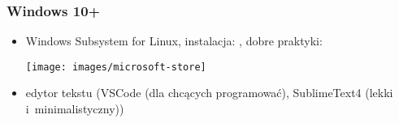 \begin{frame}
\frametitle{Windows 10+}

\begin{itemize}\scriptsize

 \item Windows Subsystem for Linux,\newline
 instalacja: ,\newline
 dobre
 praktyki: 

 \texttt{[image: images/microsoft-store]}

 \item edytor tekstu (VSCode (dla chcących programować), SublimeText4
 (lekki i~minimalistyczny))




\end{itemize}
\end{frame}

